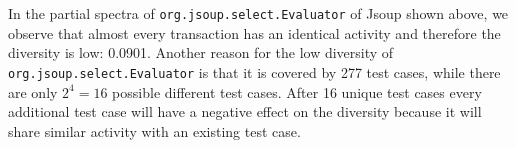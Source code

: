 \documentclass[twoside,a4paper,11pt]{memoir}
\begin{document}
\begin{table}[]
\scriptsize
\centering
\caption{My caption}
\label{my-label}
\noindent{}
\end{table}

In the partial spectra of \texttt{org.jsoup.select.Evaluator} of Jsoup shown above, we observe that almost every transaction has an identical activity and therefore the diversity is low: 0.0901.
Another reason for the low diversity of \texttt{org.jsoup.select.Evaluator} is that it is covered by 277 test cases, while there are only $2^4 = 16$ possible different test cases.
After 16 unique test cases every additional test case will have a negative effect on the diversity because it will share similar activity with an existing test case.
\end{document}
